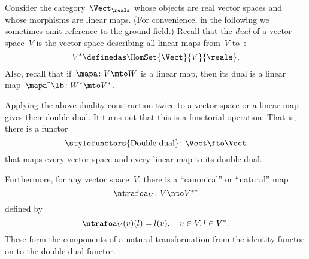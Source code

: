 \begin{example}
	\label{ex:Vect}
	Consider the category~$\Vect_{\reals}$ whose objects are real vector spaces and whose morphisms are linear maps.
	(For convenience, in the following we sometimes omit reference to the ground field.)
	Recall that the \emph{dual} of a vector space~$V$ is the vector space describing all linear maps from~$V$ to~\reals:
	\begin{equation}
		\label{eq:dual-vector-space}
		V^* \definedas \HomSet{\Vect}{V}{\reals},
	\end{equation}
	Also, recall that if~$\mapa\colon V \mto W$ is a linear map, then its dual is a linear map~$\mapa^* \lb  \colon W^* \mto V^*$.

	Applying the above duality construction twice to a vector space or a linear map gives their double dual.
	It turns out that this is a functorial operation.
	That is, there is a functor
	\begin{equation}
		\label{eq:double-dual-functor}
		\text{\stylefunctors{Double dual}}\colon \Vect \fto \Vect
	\end{equation}
	that maps every vector space and every linear map to its double dual.

	Furthermore, for any vector space~$V$, there is a ``canonical'' or ``natural'' map~
	\begin{equation}
		\ntrafoa_V \colon V \nto V^{**}
	\end{equation}
	defined by
	\begin{equation}
		\label{eq:natural-trafo-to-double-dual}
		\ntrafoa_V(v)(l) = l(v), \quad  v \in V, l \in V^*.
	\end{equation}
	These form the components of a natural transformation from the identity functor on \Vect to the double dual functor.
	\begin{center}
	\end{center}
\end{example}

